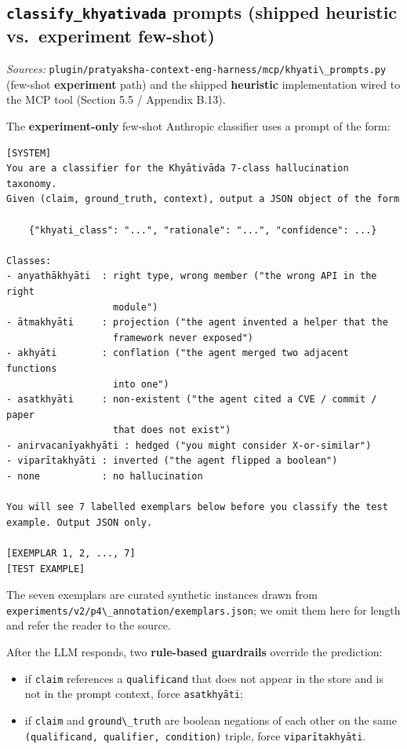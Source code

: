 \subsection{\texorpdfstring{\texttt{classify\_khyativada} prompts (shipped heuristic vs.~experiment few-shot)}{classify\_khyativada prompts (shipped heuristic vs.~experiment few-shot)}}\label{classify_khyativada-prompts-shipped-heuristic-vs.-experiment-few-shot}

\emph{Sources:} \passthrough{\lstinline!plugin/pratyaksha-context-eng-harness/mcp/khyati\_prompts.py!} (few-shot \textbf{experiment} path) and the shipped \textbf{heuristic} implementation wired to the MCP tool (Section 5.5 / Appendix B.13).

The \textbf{experiment-only} few-shot Anthropic classifier uses a prompt of the form:

\begin{lstlisting}
[SYSTEM]
You are a classifier for the Khyātivāda 7-class hallucination taxonomy.
Given (claim, ground_truth, context), output a JSON object of the form

    {"khyati_class": "...", "rationale": "...", "confidence": ...}

Classes:
- anyathākhyāti  : right type, wrong member ("the wrong API in the right
                   module")
- ātmakhyāti     : projection ("the agent invented a helper that the
                   framework never exposed")
- akhyāti        : conflation ("the agent merged two adjacent functions
                   into one")
- asatkhyāti     : non-existent ("the agent cited a CVE / commit / paper
                   that does not exist")
- anirvacanīyakhyāti : hedged ("you might consider X-or-similar")
- viparītakhyāti : inverted ("the agent flipped a boolean")
- none           : no hallucination

You will see 7 labelled exemplars below before you classify the test
example. Output JSON only.

[EXEMPLAR 1, 2, ..., 7]
[TEST EXAMPLE]
\end{lstlisting}

The seven exemplars are curated synthetic instances drawn from \passthrough{\lstinline!experiments/v2/p4\_annotation/exemplars.json!}; we omit them here for length and refer the reader to the source.

After the LLM responds, two \textbf{rule-based guardrails} override the prediction:

\begin{itemize}
\tightlist
\item
  if \passthrough{\lstinline!claim!} references a \passthrough{\lstinline!qualificand!} that does not appear in the
  store and is not in the prompt context, force \passthrough{\lstinline!asatkhyāti!};
\item
  if \passthrough{\lstinline!claim!} and \passthrough{\lstinline!ground\_truth!} are boolean negations of each other
  on the same \passthrough{\lstinline!(qualificand, qualifier, condition)!} triple, force
  \passthrough{\lstinline!viparītakhyāti!}.
\end{itemize}

